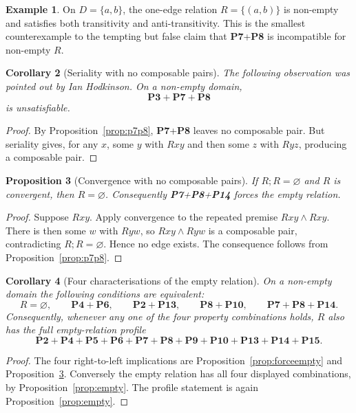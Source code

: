 \documentclass[11pt,a4paper,reqno]{amsart}
\newtheorem{proposition}{Proposition}[section]
\newtheorem{corollary}[proposition]{Corollary}
\theoremstyle{definition}
\newtheorem{example}[proposition]{Example}
\theoremstyle{remark}
\newcommand{\prop}[1]{\textbf{P#1}}
\begin{document}
\begin{example}
On $D=\{a,b\}$, the one-edge relation $R=\{(a,b)\}$ is non-empty and satisfies
both transitivity and anti-transitivity.  This is the smallest counterexample
to the tempting but false claim that \prop{7}+\prop{8} is incompatible for
non-empty $R$.
\end{example}

\begin{corollary}[Seriality with no composable pairs]\label{cor:p3p7p8}
The following observation was pointed out by Ian Hodkinson.  On a non-empty domain,
\[
\prop{3}+\prop{7}+\prop{8}
\]
is unsatisfiable.
\end{corollary}
\begin{proof}
By Proposition~\ref{prop:p7p8}, \prop{7}+\prop{8} leaves no composable
pair.  But seriality gives, for any $x$, some $y$ with $Rxy$ and then some
$z$ with $Ryz$, producing a composable pair.
\end{proof}

\begin{proposition}[Convergence with no composable pairs]
\label{prop:nocomp-conv}
If $R;R=\varnothing$ and $R$ is convergent, then $R=\varnothing$.
Consequently \prop{7}+\prop{8}+\prop{14} forces the empty relation.
\end{proposition}
\begin{proof}
Suppose $Rxy$.  Apply convergence to the repeated premise
$Rxy\wedge Rxy$.  There is then some $w$ with $Ryw$, so $Rxy\wedge Ryw$ is a
composable pair, contradicting $R;R=\varnothing$.  Hence no edge exists.  The
consequence follows from Proposition~\ref{prop:p7p8}.
\end{proof}

\begin{corollary}[Four characterisations of the empty relation]
\label{cor:empty-characterisations}
On a non-empty domain the following conditions are equivalent:
\[
R=\varnothing,\qquad
\prop{4}+\prop{6},\qquad
\prop{2}+\prop{13},\qquad
\prop{8}+\prop{10},\qquad
\prop{7}+\prop{8}+\prop{14}.
\]
Consequently, whenever any one of the four property combinations holds,
$R$ also has the full empty-relation profile
\[
\prop{2}+\prop{4}+\prop{5}+\prop{6}+\prop{7}+\prop{8}+\prop{9}+
\prop{10}+\prop{13}+\prop{14}+\prop{15}.
\]
\end{corollary}
\begin{proof}
The four right-to-left implications are
Proposition~\ref{prop:forceempty} and
Proposition~\ref{prop:nocomp-conv}.  Conversely the empty relation has all
four displayed combinations, by Proposition~\ref{prop:empty}.  The profile
statement is again Proposition~\ref{prop:empty}.
\end{proof}
\end{document}
